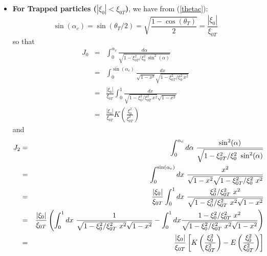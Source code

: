 \begin{itemize}
\item  \textbf{For Trapped particles ($|\xi _{0}|<\xi _{0T}$)}, we have from
(\ref{thetac}):
\begin{equation}
\sin (\alpha _{c})=\sin (\theta _{T}/2)=\sqrt{\frac{1-\cos (\theta _{T})}{2}}%
=\frac{|\xi _{0}|}{\xi _{0T}}
\end{equation}
so that
\begin{eqnarray}
J_{0} &=&\int_{0}^{\alpha _{c}}\frac{d\alpha }{\sqrt{1-\xi _{0T}^{2}/\xi
_{0}^{2}\ \sin ^{2}(\alpha )}}  \nonumber \\
&=&\int_{0}^{\sin (\alpha _{c})}\frac{dx}{\sqrt{1-x^{2}}\sqrt{1-\xi
_{0T}^{2}/\xi _{0}^{2}\ x^{2}}}  \nonumber \\
&=&\frac{|\xi _{0}|}{\xi _{0T}}\int_{0}^{1}\frac{dx}{\sqrt{1-\xi
_{0}^{2}/\xi _{0T}^{2}\ x^{2}}\sqrt{1-x^{2}}}  \nonumber \\
&=&\frac{|\xi _{0}|}{\xi _{0T}}K\left( \frac{\xi _{0}^{2}}{\xi _{0T}^{2}}%
\right)
\end{eqnarray}
and
\begin{eqnarray}
J_{2} &=&\int_{0}^{\alpha _{c}}d\alpha \ \frac{\sin ^{2}(\alpha )}{\sqrt{%
1-\xi _{0T}^{2}/\xi _{0}^{2}\ \sin ^{2}(\alpha )}}  \nonumber \\
&=&\int_{0}^{\sin (\alpha _{c})}dx\ \frac{x^{2}}{\sqrt{1-x^{2}}\sqrt{1-\xi
_{0T}^{2}/\xi _{0}^{2}\ x^{2}}}  \nonumber \\
&=&\frac{|\xi _{0}|}{\xi _{0T}}\int_{0}^{1}dx\ \frac{\xi _{0}^{2}/\xi
_{0T}^{2}\ x^{2}}{\sqrt{1-\xi _{0}^{2}/\xi _{0T}^{2}\ x^{2}}\sqrt{1-x^{2}}}
\nonumber \\
&=&\frac{|\xi _{0}|}{\xi _{0T}}\left( \int_{0}^{1}dx\ \frac{1}{\sqrt{1-\xi
_{0}^{2}/\xi _{0T}^{2}\ x^{2}}\sqrt{1-x^{2}}}-\int_{0}^{1}dx\frac{1-\xi
_{0}^{2}/\xi _{0T}^{2}\ x^{2}}{\sqrt{1-\xi _{0}^{2}/\xi _{0T}^{2}\ x^{2}}%
\sqrt{1-x^{2}}}\right)   \nonumber \\
&=&\frac{|\xi _{0}|}{\xi _{0T}}\left[ K\left( \frac{\xi _{0}^{2}}{\xi
_{0T}^{2}}\right) -E\left( \frac{\xi _{0}^{2}}{\xi _{0T}^{2}}\right) \right]
\end{eqnarray}


\end{itemize}
